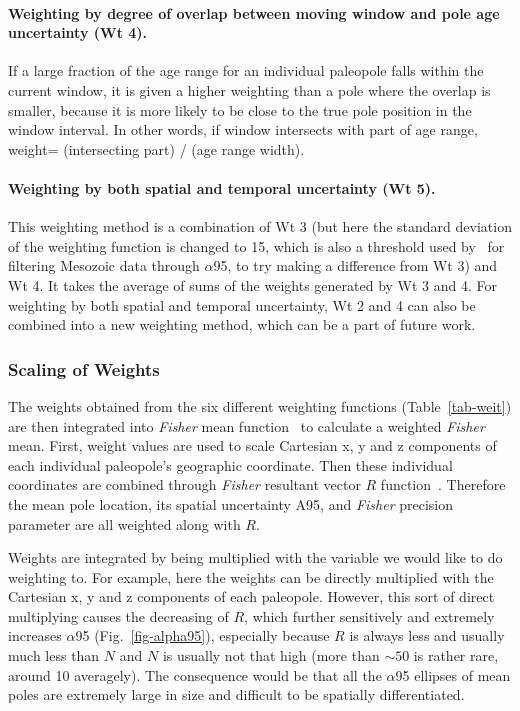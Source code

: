 \paragraph{Weighting by degree of overlap between moving window and pole age
uncertainty (Wt 4).} If a large fraction of the age range for an individual
paleopole falls within the current window, it is given a higher weighting than a
pole where the overlap is smaller, because it is more likely to be close to the
true pole position in the window interval. In other words, if window intersects
with part of age range, weight= (intersecting part) / (age range width).

\paragraph{Weighting by both spatial and temporal uncertainty (Wt 5).} This
weighting method is a combination of Wt 3 (but here the standard deviation of
the weighting function is changed to 15, which is also a threshold used
by~\citet{B02} for filtering Mesozoic data through $\alpha$95, to try making a
difference from Wt 3) and Wt 4. It takes the average of sums of the weights
generated by Wt 3 and 4. For weighting by both spatial and temporal uncertainty,
Wt 2 and 4 can also be combined into a new weighting method, which can be a part
of future work.

\subsubsection{Scaling of Weights}

The weights obtained from the six different weighting functions
(Table~\ref{tab-weit}) are then integrated into \emph{Fisher} mean function~\citep{F53}
to calculate a weighted \emph{Fisher} mean. First, weight values are used to scale
Cartesian x, y and z components of each individual paleopole's geographic
coordinate. Then these individual coordinates are combined through \emph{Fisher}
resultant vector $R$ function~\citep[see][chap.~11]{T20}. Therefore the mean
pole location, its spatial uncertainty A95, and \emph{Fisher} precision parameter are
all weighted along with $R$.

Weights are integrated by being multiplied with the variable we would like to do
weighting to. For example, here the weights can be directly multiplied with the
Cartesian x, y and z components of each paleopole. However, this sort of direct
multiplying causes the decreasing of $R$, which further sensitively and
extremely increases $\alpha$95 (Fig.~\ref{fig-alpha95}), especially because $R$
is always less and usually much less than $N$ and $N$ is usually not that high
(more than ${\sim}50$ is rather rare, around 10 averagely). The consequence
would be that all the $\alpha$95 ellipses of mean poles are extremely large in
size and difficult to be spatially differentiated.  %

